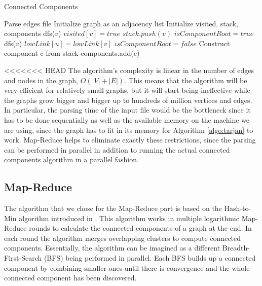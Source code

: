 \begin{algorithm}
	\caption{Connected Components}
	\label{algo:tarjan}
	\begin{algorithmic}[1]
		\State Parse edges file
		\State Initialize graph as an adjacency list
		\State Initialize visited, stack, components
				\State dfs($v$)
			\EndIf
		\EndFor
			\State $visited[v] = true$
			\State $stack.push(v)$
			\State $isComponentRoot = true$
					\State dfs($v$)
				\EndIf
					\State $lowLink[u] = lowLink[v]$
					\State $isComponentRoot = false$
				\EndIf
			\EndFor
				\State Construct component c from stack
				\State components.add(c)
			\EndIf
		\EndFunction
	\end{algorithmic}
\end{algorithm}

<<<<<<< HEAD
The algorithm's complexity is linear in the number of edges and nodes in the graph, \ie $O(|V| + |E|)$. This means that the algorithm will be very efficient for relatively small graphs, but it will start being ineffective while the graphs grow bigger and bigger up to hundreds of million vertices and edges. In particular, the parsing time of the input file would be the bottleneck since it has to be done sequentially as well as the available memory on the machine we are using, since the graph has to fit in its memory for Algorithm \ref{algo:tarjan} to work. Map-Reduce helps to eliminate exactly these restrictions, since the parsing can be performed in parallel in addition to running the actual connected components algorithm in a parallel fashion.

\subsection{Map-Reduce}

The algorithm that we chose for the Map-Reduce part is based on the Hash-to-Min algorithm introduced in \cite{rastogi}. This algorithm works in multiple logarithmic Map-Reduce rounds  to calculate the connected components of a graph at the end. In each round the algorithm merges overlapping clusters to compute connected components. Essentially, the algorithm can be imagined as a different Breadth-First-Search (\eg BFS) being performed in parallel. Each BFS builds up a connected component by combining smaller ones until there is convergence and the whole connected component has been discovered.

